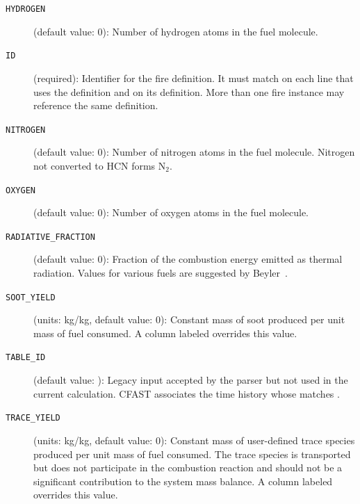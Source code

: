 {{\begin{description}
\item[\texttt{HYDROGEN}] (default value: 0): Number of hydrogen atoms in the fuel molecule.
\item[\texttt{ID}] (required): Identifier for the fire definition. It must match  on each  line that uses the definition and  on its  definition. More than one fire instance may reference the same definition.
\item[\texttt{NITROGEN}] (default value: 0): Number of nitrogen atoms in the fuel molecule. Nitrogen not converted to HCN forms N$_2$.
\item[\texttt{OXYGEN}] (default value: 0): Number of oxygen atoms in the fuel molecule.
\item[\texttt{RADIATIVE\_FRACTION}] (default value: 0): Fraction of the combustion energy emitted as thermal radiation. Values for various fuels are suggested by Beyler~\cite{Beyler2:SFPE}.
\item[\texttt{SOOT\_YIELD}] (units: kg/kg, default value: 0): Constant mass of soot produced per unit mass of fuel consumed. A  column labeled  overrides this value.
\item[\texttt{TABLE\_ID}] (default value: ): Legacy input accepted by the parser but not used in the current calculation. CFAST associates the time history whose   matches  .
\item[\texttt{TRACE\_YIELD}] (units: kg/kg, default value: 0): Constant mass of user-defined trace species produced per unit mass of fuel consumed. The trace species is transported but does not participate in the combustion reaction and should not be a significant contribution to the system mass balance. A  column labeled  overrides this value.
\end{description}



}}
